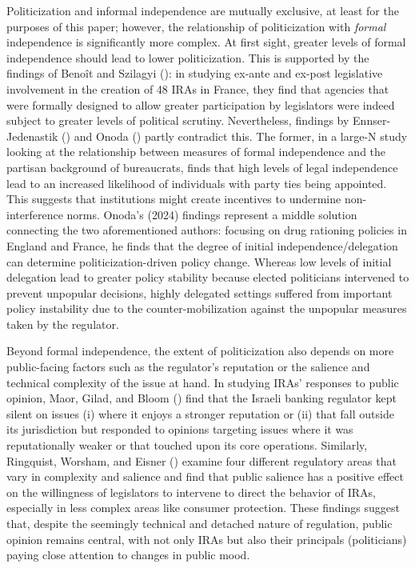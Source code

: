 \documentclass[
  11pt,
  letterpaper,
  DIV=11,
  numbers=noendperiod]{scrartcl}
\begin{document}
Politicization and informal independence are mutually exclusive, at
least for the purposes of this paper; however, the relationship of
politicization with \emph{formal} independence is significantly more
complex. At first sight, greater levels of formal independence should
lead to lower politicization. This is supported by the findings of
Benoît and Szilagyi (): in studying
ex-ante and ex-post legislative involvement in the creation of 48 IRAs
in France, they find that agencies that were formally designed to allow
greater participation by legislators were indeed subject to greater
levels of political scrutiny. Nevertheless, findings by
Ennser-Jedenastik () and Onoda
() partly contradict this. The former, in
a large-N study looking at the relationship between measures of formal
independence and the partisan background of bureaucrats, finds that high
levels of legal independence lead to an increased likelihood of
individuals with party ties being appointed. This suggests that
institutions might create incentives to undermine non-interference
norms. Onoda's (2024) findings represent a middle solution connecting
the two aforementioned authors: focusing on drug rationing policies in
England and France, he finds that the degree of initial
independence/delegation can determine politicization-driven policy
change. Whereas low levels of initial delegation lead to greater policy
stability because elected politicians intervened to prevent unpopular
decisions, highly delegated settings suffered from important policy
instability due to the counter-mobilization against the unpopular
measures taken by the regulator.

Beyond formal independence, the extent of politicization also depends on
more public-facing factors such as the regulator's reputation or the
salience and technical complexity of the issue at hand. In studying
IRAs' responses to public opinion, Maor, Gilad, and Bloom
() find that the Israeli banking regulator
kept silent on issues (i) where it enjoys a stronger reputation or (ii)
that fall outside its jurisdiction but responded to opinions targeting
issues where it was reputationally weaker or that touched upon its core
operations. Similarly, Ringquist, Worsham, and Eisner
() examine four different regulatory
areas that vary in complexity and salience and find that public salience
has a positive effect on the willingness of legislators to intervene to
direct the behavior of IRAs, especially in less complex areas like
consumer protection. These findings suggest that, despite the seemingly
technical and detached nature of regulation, public opinion remains
central, with not only IRAs but also their principals (politicians)
paying close attention to changes in public mood.
\end{document}

